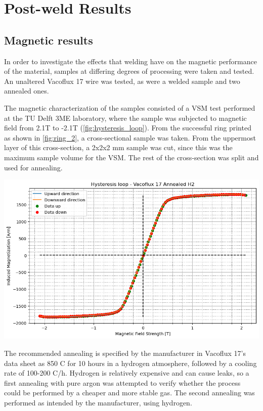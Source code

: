 \section{Post-weld Results}

\subsection{Magnetic results}

In order to investigate the effects that welding have on the magnetic performance of the material, samples at differing degrees of processing were taken and tested. An unaltered Vacoflux 17 wire was tested, as were a welded sample and two annealed ones.

The magnetic characterization of the samples consisted of a VSM test performed at the TU Delft 3ME laboratory, where the sample was subjected to magnetic field from 2.1T to -2.1T (\autoref{fig:hysteresis_loop}). From the successful ring printed as shown in \autoref{fig:ring_2}, a cross-sectional sample was taken. From the uppermost layer of this cross-section, a 2x2x2 mm sample was cut, since this was the maximum sample volume for the VSM. The rest of the cross-section was split and used for annealing.

\begin{minipage}{\linewidth}
    \centering
    \includegraphics[width=\linewidth]{images/annealed_H2.png}
    \label{fig:hysteresis_loop}
\end{minipage}

The recommended annealing is specified by the manufacturer in Vacoflux 17's data sheet as 850 C for 10 hours in a hydrogen atmosphere, followed by a cooling rate of 100-200 C/h. Hydrogen is relatively expensive and can cause leaks, so a first annealing with pure argon was attempted to verify whether the process could be performed by a cheaper and more stable gas. The second annealing was performed as intended by the manufacturer, using hydrogen.


